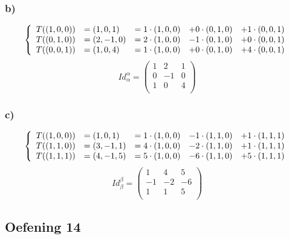 \documentclass[lineaire_algebra_oplossingen.tex]{subfiles}
\begin{document}
\subsubsection*{b)}
\[
\left\lbrace
\begin{array}{c l c c c}
T((1,0,0)) &= (1,0,1) &= 1\cdot (1,0,0) &+ 0\cdot (0,1,0) &+ 1\cdot (0,0,1) \\
T((0,1,0)) &= (2,-1,0)&= 2\cdot (1,0,0) &- 1\cdot (0,1,0) &+ 0\cdot (0,0,1)\\
T((0,0,1)) &= (1,0,4) &= 1\cdot (1,0,0) &+ 0\cdot (0,1,0) &+ 4\cdot (0,0,1)\\ 
\end{array}
\right.
\]
\[
Id_\alpha^\alpha = 
\begin{pmatrix}
1 & 2 & 1\\
0 & -1 & 0\\
1 & 0 & 4\\
\end{pmatrix}
\]

\subsubsection*{c)}
\[
\left\lbrace
\begin{array}{c l c c c}
T((1,0,0)) &= (1,0,1) &= 1\cdot (1,0,0) &- 1\cdot (1,1,0) &+ 1\cdot (1,1,1)\\
T((1,1,0)) &= (3,-1,1)&= 4\cdot (1,0,0) &- 2\cdot (1,1,0) &+ 1\cdot (1,1,1)\\
T((1,1,1)) &= (4,-1,5)&= 5\cdot (1,0,0) &- 6\cdot (1,1,0) &+ 5\cdot (1,1,1)\\
\end{array}
\right.
\]
\[
Id_\beta^\beta = 
\begin{pmatrix}
1 & 4 & 5\\
-1 & -2 & -6\\
1 & 1 & 5\\
\end{pmatrix}
\]

\subsection{Oefening 14}
\end{document}
